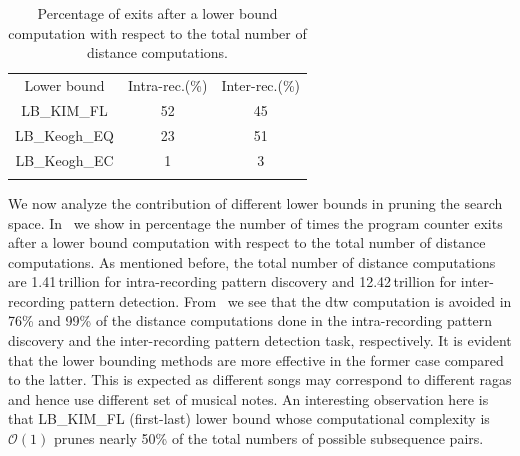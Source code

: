 \begin{table} 
	\begin{centering}
		\begin{tabular}{ c | c c }
			\tabletop
			Lower bound   	& Intra-rec.(\%)		&	Inter-rec.(\%) \\	
			\tablemid
			LB\_KIM\_FL   	& 52	&	45 \\	
			LB\_Keogh\_EQ   	& 23	&	51 \\
			LB\_Keogh\_EC   		& 1	&	3 \\
			\tablebot
		\end{tabular}
		\caption{Percentage of exits after a lower bound computation with respect to the total number of distance computations.}
		\label{tab:computationalStats}	
		\par \end{centering}	
\end{table}

We now analyze the contribution of different lower bounds in pruning the search space. In~ we show in percentage the number of times the program counter exits after a lower bound computation with respect to the total number of distance computations. As mentioned before, the total number of distance computations are 1.41\,trillion for intra-recording pattern discovery and 12.42\,trillion for inter-recording pattern detection. From~ we see that the \gls{dtw} computation is avoided in 76\% and 99\% of the distance computations done in the intra-recording pattern discovery and the inter-recording pattern detection task, respectively. It is evident that the lower bounding methods are more effective in the former case compared to the latter. This is expected as different songs may correspond to different \glspl{raga} and hence use different set of musical notes. An interesting observation here is that LB\_KIM\_FL (first-last) lower bound whose computational complexity is $\mathcal{O}(1)$ prunes nearly 50\% of the total numbers of possible subsequence pairs. 

